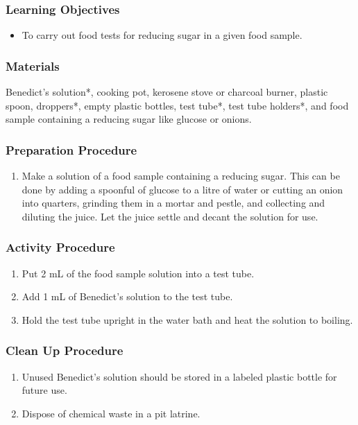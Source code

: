 \subsubsection*{Learning Objectives}
\begin{itemize}
\item{To carry out food tests for reducing sugar in a given food sample.}
\end{itemize}

\subsubsection*{Materials}
Benedict's solution*, cooking pot, kerosene stove or charcoal burner, plastic spoon, droppers*, empty plastic bottles, test tube*, test tube holders*, and food sample containing a reducing sugar like glucose or onions.

\subsubsection*{Preparation Procedure}
\begin{enumerate}
\item{Make a solution of a food sample containing a reducing sugar. This can be done by adding a spoonful of glucose to a litre of water or cutting an onion into quarters, grinding them in a mortar and pestle, and collecting and diluting the juice. Let the juice settle and decant the solution for use.}
\end{enumerate}

\subsubsection*{Activity Procedure}
\begin{enumerate}
\item{Put 2 mL of the food sample solution into a test tube.}
\item{Add 1 mL of Benedict's solution to the test tube.}
\item{Hold the test tube upright in the water bath and heat the solution to boiling.}
\end{enumerate}

\subsubsection*{Clean Up Procedure}
\begin{enumerate}
\item{Unused Benedict's solution should be stored in a labeled plastic bottle for future use.}
\item{Dispose of chemical waste in a pit latrine.}
\end{enumerate}

